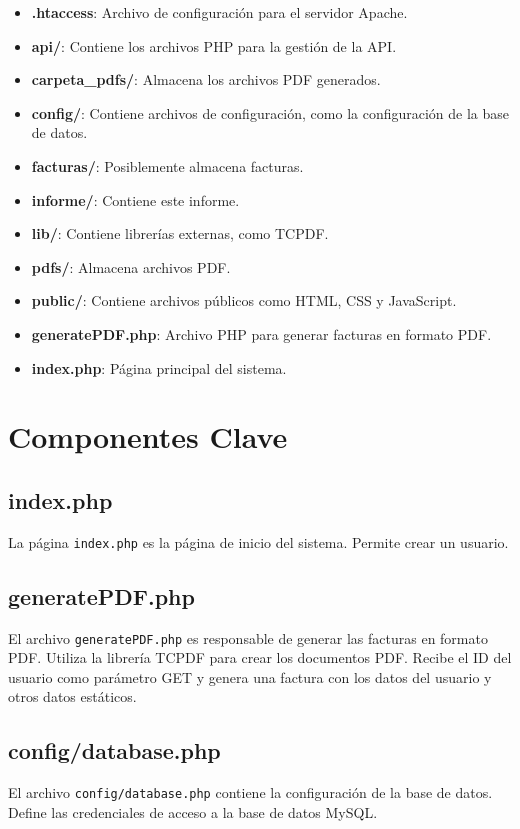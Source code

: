 \documentclass{article}
\begin{document}
\begin{itemize}
    \item \textbf{.htaccess}: Archivo de configuración para el servidor Apache.
    \item \textbf{api/}: Contiene los archivos PHP para la gestión de la API.
    \item \textbf{carpeta\_pdfs/}: Almacena los archivos PDF generados.
    \item \textbf{config/}: Contiene archivos de configuración, como la configuración de la base de datos.
    \item \textbf{facturas/}: Posiblemente almacena facturas.
    \item \textbf{informe/}: Contiene este informe.
    \item \textbf{lib/}: Contiene librerías externas, como TCPDF.
    \item \textbf{pdfs/}: Almacena archivos PDF.
    \item \textbf{public/}: Contiene archivos públicos como HTML, CSS y JavaScript.
    \item \textbf{generatePDF.php}: Archivo PHP para generar facturas en formato PDF.
    \item \textbf{index.php}: Página principal del sistema.
\end{itemize}

\section{Componentes Clave}

\subsection{index.php}
La página \texttt{index.php} es la página de inicio del sistema. Permite crear un usuario.

\subsection{generatePDF.php}
El archivo \texttt{generatePDF.php} es responsable de generar las facturas en formato PDF. Utiliza la librería TCPDF para crear los documentos PDF. Recibe el ID del usuario como parámetro GET y genera una factura con los datos del usuario y otros datos estáticos.

\subsection{config/database.php}
El archivo \texttt{config/database.php} contiene la configuración de la base de datos. Define las credenciales de acceso a la base de datos MySQL.
\end{document}
